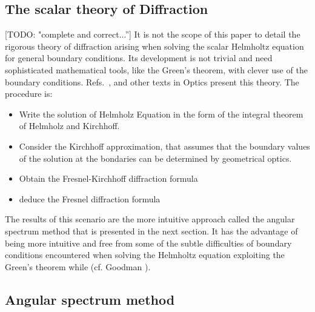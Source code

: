 \documentclass{iucr}              %
\newcommand{\todo}[1]{{\color{red}[TODO: "#1'']}}
\begin{document}
\subsection{The scalar theory of Diffraction}
\todo{complete and correct...}
It is not the scope of this paper to detail the rigorous theory of diffraction arising when solving the scalar Helmholtz equation for general boundary conditions. Its development is not trivial and need sophisticated mathematical tools, like the Green's theorem, with clever use of the boundary conditions. Refs.~\cite{bornwolf}, \cite{nieto} and other texts in Optics present this theory. The procedure is: 
\begin{itemize}
  \item Write the solution of Helmholz Equation in the form of the integral theorem of Helmholz and Kirchhoff. 
  \item Consider the Kirchhoff approximation, that assumes that the boundary values of the solution at the bondaries can be determined by geometrical optics.
  \item Obtain the Fresnel-Kirchhoff diffraction formula
  \item deduce the Fresnel diffraction formula
\end{itemize}
% 
The results of this scenario are the more intuitive approach called the angular spectrum method that is presented in the next section. It has the advantage of being more intuitive and free from some of the subtle difficulties of boundary conditions encountered when solving the Helmholtz equation exploiting the Green's theorem while (cf. Goodman \cite{goodmanfourier}).


\subsection{Angular spectrum method}
\end{document}
